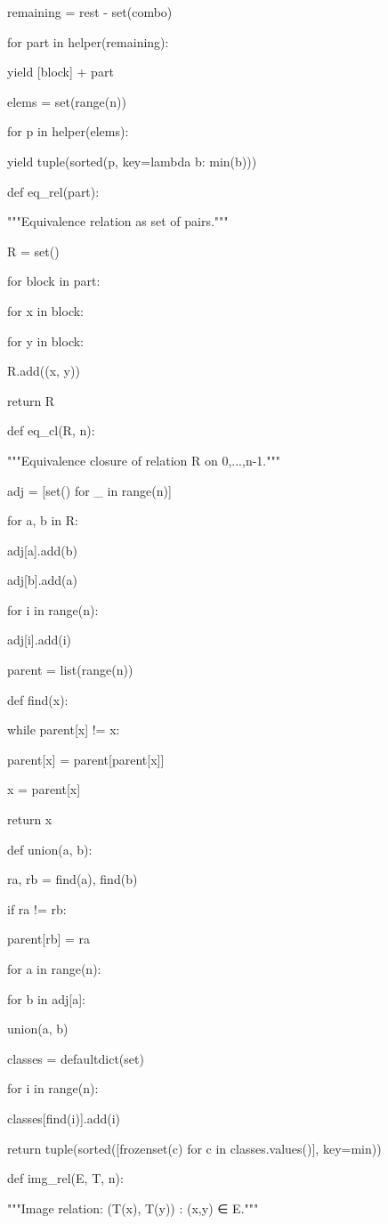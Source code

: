 remaining = rest - set(combo)

for part in helper(remaining):

yield [block] + part

elems = set(range(n))

for p in helper(elems):

yield tuple(sorted(p, key=lambda b: min(b)))


def eq_rel(part):

"""Equivalence relation as set of pairs."""

R = set()

for block in part:

for x in block:

for y in block:

R.add((x, y))

return R


def eq_cl(R, n):

"""Equivalence closure of relation R on {0,...,n-1}."""

adj = [set() for _ in range(n)]

for a, b in R:

adj[a].add(b)

adj[b].add(a)

for i in range(n):

adj[i].add(i)

parent = list(range(n))

def find(x):

while parent[x] != x:

parent[x] = parent[parent[x]]

x = parent[x]

return x

def union(a, b):

ra, rb = find(a), find(b)

if ra != rb:

parent[rb] = ra

for a in range(n):

for b in adj[a]:

union(a, b)

classes = defaultdict(set)

for i in range(n):

classes[find(i)].add(i)

return tuple(sorted([frozenset(c) for c in classes.values()], key=min))


def img_rel(E, T, n):

"""Image relation: {(T(x), T(y)) : (x,y) ∈ E}."""

